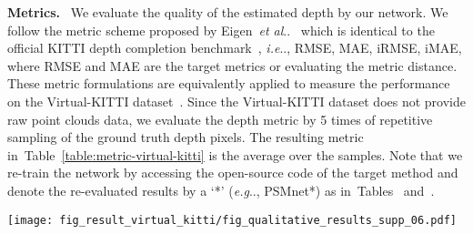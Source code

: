 \documentclass[letterpaper, 10 pt, conference]{ieeeconf}
\makeatletter
\DeclareRobustCommand\onedot{\futurelet\@let@token\@onedot}
\def\@onedot{\ifx\@let@token.\else.\null\fi\xspace}
\def\eg{\emph{e.g}\onedot} \def\Eg{{E.g}\onedot}
\def\ie{\emph{i.e}\onedot} \def\Ie{{I.e}\onedot}
\def\etal{\emph{et al}\onedot}
\newcommand{\Tref}[1]{Table~\textcolor{blue}{\ref{#1}}}
\newcommand{\RNum}[1]{\uppercase\expandafter{\romannumeral #1\relax}}
\makeatother
\begin{document}
\noindent \textbf{Metrics.} \
We evaluate the quality of the estimated depth by our network. We follow the metric scheme proposed by Eigen~\etal~\cite{eigen_mono_depth} which is identical to the official KITTI depth completion benchmark~\cite{kitti-completion}, \ie, RMSE, MAE, iRMSE, iMAE, where RMSE and MAE are the target metrics or evaluating the metric distance. These metric formulations are equivalently applied to measure the performance on the Virtual-KITTI dataset~\cite{virtual-kitti}. Since the Virtual-KITTI dataset does not provide raw point clouds data, we evaluate the depth metric by 5 times of repetitive sampling of the ground truth depth pixels. The resulting metric in~\Tref{table:metric-virtual-kitti} is the average over the samples. 
Note that we re-train the network by accessing the open-source code of the target method and denote the re-evaluated results by a `*' (\eg, PSMnet*) as in~Tables~\textcolor{blue}{\RNum{1}} and~\textcolor{blue}{\RNum{2}}.


\begin{figure*}[!t]
\vspace{+3mm}
\centering
\texttt{[image: fig\_result\_virtual\_kitti/fig\_qualitative\_results\_supp\_06.pdf]}
\vspace{-3mm}
\caption{\textbf{Qualitative results on the Virtual-KITTI 2.0 dataset.} 
We evaluate the estimated depth from both our network and the recent Stereo-LiDAR fusion network by Wang~\etal~\cite{stereolidar_norm_costV_ccvn}.
This synthetic data covers the wide range of depth upto $655m$,
but we clamp true depth maps and estimated depth maps upto $100m$ during the evaluation, as in Table~\textcolor{blue}{\RNum{2}}. 
For the detailed visualization, we crop and enlarge the part of depth error maps in each frame.
Mainly, the cropped images correspond to the farther area to validate our long-range depth estimation.
}
\label{fig:fig_result_virtual_kitti}
\vspace{-2mm}
\end{figure*}
\end{document}
